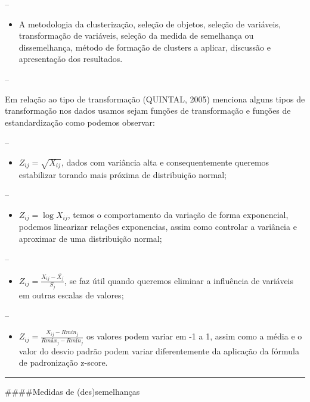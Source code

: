 \documentclass[
]{article}
\begin{document}
--

\begin{itemize}
\item
  A metodologia da clusterização, seleção de objetos, seleção de
  variáveis, transformação de variáveis, seleção da medida de semelhança
  ou dissemelhança, método de formação de clusters a aplicar, discussão
  e apresentação dos resultados.
\end{itemize}

--

Em relação ao tipo de transformação (QUINTAL, 2005) menciona alguns
tipos de transformação nos dados usamos sejam funções de transformação e
funções de estandardização como podemos observar:

--

\begin{itemize}
\item
  \(Z_{ij} = \sqrt{X_{ij}}\), dados com variância alta e
  consequentemente queremos estabilizar torando mais próxima de
  distribuição normal;
\end{itemize}

--

\begin{itemize}
\item
  \(Z_{ij} = \log{X_{ij}}\), temos o comportamento da variação de forma
  exponencial, podemos linearizar relações exponencias, assim como
  controlar a variância e aproximar de uma distribuição normal;
\end{itemize}

--

\begin{itemize}
\item
  \(Z_{ij} = \frac{X_{ij}-\bar{X_j}}{S_j}\), se faz útil quando queremos
  eliminar a influência de variáveis em outras escalas de valores;
\end{itemize}

--

\begin{itemize}
\item
  \(Z_{ij} = \frac{X_{ij}-Rmin_j}{Rmáx_j-Rmín_j}\) os valores podem
  variar em -1 a 1, assim como a média e o valor do desvio padrão podem
  variar diferentemente da aplicação da fórmula de padronização z-score.
\end{itemize}

\begin{center}\rule{0.5\linewidth}{0.5pt}\end{center}

\#\#\#\#Medidas de (des)semelhanças
\end{document}

